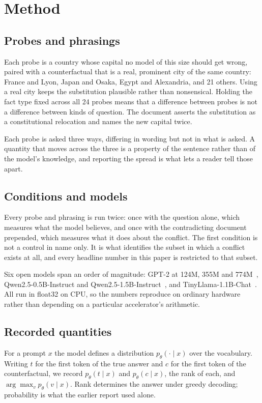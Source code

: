 \documentclass[10pt,conference]{IEEEtran}
\begin{document}
\section{Method}
\label{sec:method}
\subsection{Probes and phrasings}
Each probe is a country whose capital no model of this size should get wrong, paired with a counterfactual that is a real, prominent city of the same country: France and Lyon, Japan and Osaka, Egypt and Alexandria, and 21 others. Using a real city keeps the substitution plausible rather than nonsensical. Holding the fact type fixed across all 24 probes means that a difference between probes is not a difference between kinds of question. The document asserts the substitution as a constitutional relocation and names the new capital twice.

Each probe is asked three ways, differing in wording but not in what is asked. A quantity that moves across the three is a property of the sentence rather than of the model's knowledge, and reporting the spread is what lets a reader tell those apart.

\subsection{Conditions and models}
Every probe and phrasing is run twice: once with the question alone, which measures what the model believes, and once with the contradicting document prepended, which measures what it does about the conflict. The first condition is not a control in name only. It is what identifies the subset in which a conflict exists at all, and every headline number in this paper is restricted to that subset.

Six open models span an order of magnitude: GPT-2 at 124M, 355M and 774M~\cite{radford2019gpt2}, Qwen2.5-0.5B-Instruct and Qwen2.5-1.5B-Instruct~\cite{yang2024qwen2}, and TinyLlama-1.1B-Chat~\cite{zhang2024tinyllama}. All run in float32 on CPU, so the numbers reproduce on ordinary hardware rather than depending on a particular accelerator's arithmetic.

\subsection{Recorded quantities}
For a prompt $x$ the model defines a distribution $p_\theta(\cdot \mid x)$ over the vocabulary. Writing $t$ for the first token of the true answer and $c$ for the first token of the counterfactual, we record $p_\theta(t \mid x)$ and $p_\theta(c \mid x)$, the rank of each, and $\arg\max_v p_\theta(v \mid x)$. Rank determines the answer under greedy decoding; probability is what the earlier report used alone.
\end{document}
